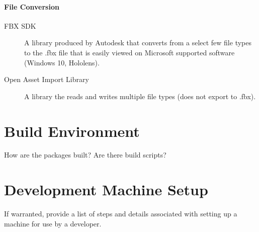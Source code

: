 \paragraph{File Conversion}
\begin{description}
    \item [FBX SDK] A library produced by Autodesk that converts from a select few file types to the .fbx file that is easily viewed on Microsoft supported software (Windows 10, Hololens).
    \item [Open Asset Import Library] A library the reads and writes multiple file types (does not export to .fbx).
\end{description}

\section{Build  Environment}
How are the packages built?  Are there build scripts? 

\section{Development Machine Setup}
If warranted, provide a list of steps and details associated with setting up a 
machine for use by a developer. 


